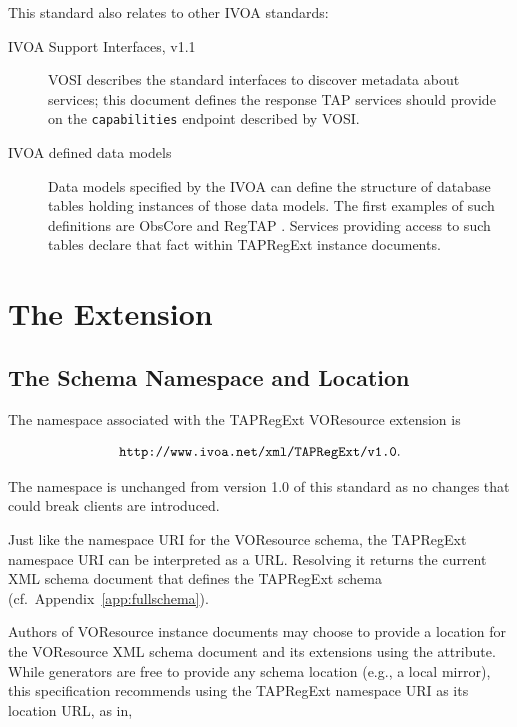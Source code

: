 \documentclass{ivoa}
\begin{document}
This standard also relates to other IVOA standards:


\begin{description}
\item[IVOA Support Interfaces, v1.1 \citep{2017ivoa.spec.0524G}] \hfil\break VOSI describes the standard interfaces to discover metadata about
services; this document defines the response TAP services should
provide on the \texttt{capabilities} endpoint described by VOSI.
\item[IVOA defined data models]Data models specified by the IVOA can define the structure of
database tables holding instances of those data models.
The first examples of such definitions are ObsCore
\citep{2017ivoa.spec.0509L} and RegTAP \citep{2019ivoa.spec.1011D}.  Services providing
access to such tables
declare that fact within TAPRegExt instance documents.

\end{description}


\section{The Extension}

\label{taextension}

\subsection{The Schema Namespace and Location}

\label{nsloc}

The namespace associated with the TAPRegExt VOResource extension is

$$
\mbox{\texttt{http://www.ivoa.net/xml/TAPRegExt/v1.0}.}
$$

The namespace is unchanged from version 1.0 of this standard as no
changes that could break clients are introduced.

Just like the namespace URI for the VOResource schema, the
TAPRegExt namespace URI can be interpreted as a URL.  Resolving it
returns the current XML schema document
that defines the TAPRegExt schema (cf.~Appendix~\ref{app:fullschema}).

Authors of VOResource instance documents may choose to
provide a location for the VOResource XML schema document and its
extensions using the
 attribute.  
While generators are
free to provide any schema location (e.g., a local mirror), this specification
recommends using the TAPRegExt namespace URI as its location URL,
as in,
\end{document}
